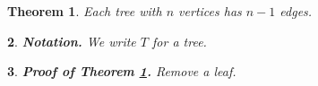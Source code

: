 \documentclass{amsart}
\newtheorem{thm}{Theorem}
\newtheorem{subsec}[thm]{}
\begin{document}
\begin{thm}\label{a} Each tree with $n$ vertices has $n-1$ edges. \end{thm}
\begin{subsec}{\bf Notation.} We write $T$ for a tree. \end{subsec}
\begin{subsec}{\bf Proof of Theorem \ref{a}.} Remove a leaf. \end{subsec}
\end{document}
